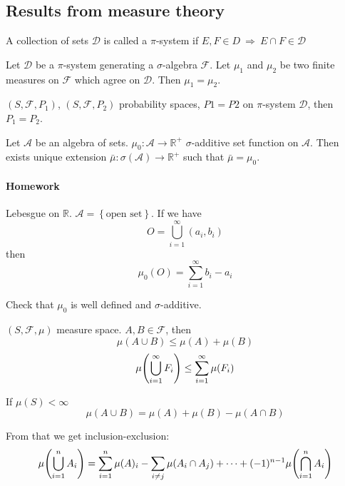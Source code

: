\subsection{Results from measure theory}
\begin{definition}
	A collection of sets $\mathcal{D}$ is called a $\pi$-system if $E,F \in D \: \Rightarrow \: E\cap F \in \mathcal{D}$
\end{definition}
\begin{theorem}[Uniqness]
	Let $\mathcal{D}$ be a $\pi$-system generating a $\sigma$-algebra $\mathcal{F}$. Let $\mu_1$ and $\mu_2$ be two finite measures on $\mathcal{F}$ which agree on $\mathcal{D}$. Then $\mu_1=\mu_2$.
	
	\begin{coll}
		$(S,\mathcal{F}, P_1)$, $(S,\mathcal{F}, P_2)$ probability spaces, $P1=P2$ on $\pi$-system $\mathcal{D}$, then $P_1=P_2$.
	\end{coll}
\end{theorem}

\begin{theorem}
	Let $\mathcal{A}$ be an algebra of sets. $\mu_0: \mathcal{A} \to \mathbb{R}^+$ $\sigma$-additive set function on $\mathcal{A}$. Then exists unique extension $\bar{\mu} : \sigma(\mathcal{A}) \to \mathbb{R}^+ $ such that $\bar{\mu} = \mu_0$.
\end{theorem}

\paragraph{Homework}
Lebesgue on $\mathbb{R}$.  $\mathcal{A} = \left\{ \text{open set} \right\}$. If we have
$$O = \bigcup_{i=1}^\infty (a_i, b_i)$$
then
$$\mu_0(O) = \sum_{i=1}^\infty b_i-a_i$$

Check that $\mu_0$ is well defined and $\sigma$-additive.

\begin{lemma}
	
	$(S,\mathcal{F}, \mu)$ measure space. $A,B \in \mathcal{F}$, then
	$$\mu(A\cup B) \leq \mu(A) + \mu(B) $$
	$$\mu\qty(\bigcup_{i=1}^\infty F_i) \leq \sum_{i=1}^\infty \mu(F_i) $$
	
	If $\mu(S) < \infty$
	$$\mu(A\cup B) = \mu(A) + \mu(B) - \mu(A\cap B)$$
	
	From that we get inclusion-exclusion:
	$$\mu\qty(\bigcup_{i=1}^n A_i) = \sum_{i=1}^n \mu(A)_i - \sum_{i\neq j}\mu(A_i\cap A_j) + \dots + (-1)^{n-1} \mu\qty(\bigcap_{i=1}^n A_i)$$
\end{lemma}
